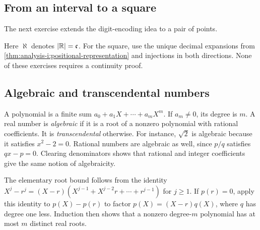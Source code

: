 \subsection{From an interval to a square}
The next exercise extends the digit-encoding idea to a pair of points.

Here $\aleph$ denotes $|\mathbb{R}|=\mathfrak c$.
For the square, use the unique decimal expansions from
\autoref{thm:analysis-i:positional-representation} and injections in
both directions. None of these exercises requires a continuity proof.



\subsection{Algebraic and transcendental numbers}
\label{sec:analysis-i:algebraic-transcendental}
A polynomial is a finite sum $a_0+a_1X+\cdots+a_mX^m$.
If $a_m\ne0$, its degree is $m$.
A real number is \emph{algebraic} if it is a root of a nonzero polynomial
with rational coefficients. It is \emph{transcendental} otherwise.
For instance, $\sqrt{2}$ is algebraic because it satisfies $x^2-2=0$.
Rational numbers are algebraic as well, since $p/q$ satisfies $qx-p=0$.
Clearing denominators shows that rational and integer coefficients give
the same notion of algebraicity.

The elementary root bound follows from the identity
$X^j-r^j=(X-r)(X^{j-1}+X^{j-2}r+\cdots+r^{j-1})$ for $j\geq1$.
If $p(r)=0$, apply this identity to $p(X)-p(r)$ to factor
$p(X)=(X-r)q(X)$, where $q$ has degree one less.
Induction then shows that a nonzero degree-$m$ polynomial has at most
$m$ distinct real roots.

